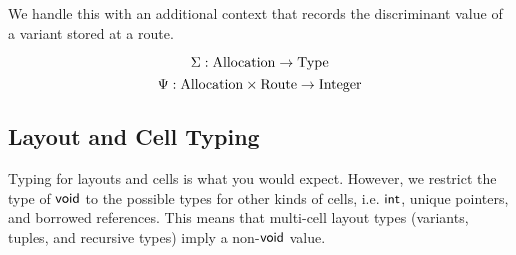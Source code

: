 We handle this with an additional context that records the discriminant value
of a variant stored at a route. 

$$ \Sigma : \mathrm{Allocation} \to \mathrm{Type}$$
$$ \Psi : \mathrm{Allocation} \times \mathrm{Route} \to \mathrm{Integer} $$



\subsection*{Layout and Cell Typing}
Typing for layouts and cells is what you would expect.
However, we restrict the type of $\mathsf{void}$ to the possible types for other
kinds of cells, i.e. $\mathsf{int}$, unique pointers, and borrowed references.
This means that multi-cell layout types (variants, tuples, and recursive types) imply
a non-$\mathsf{void}$ value.
\newline




